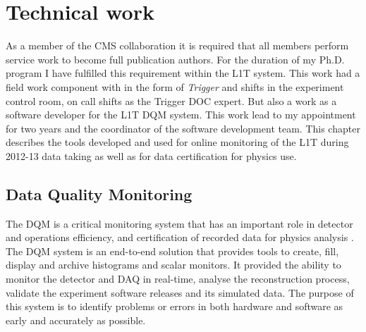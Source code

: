 \chapter{Technical work}
\label{CHAPTER:TechnicalWork}

\glsresetall %


As a member of the \gls{CMS} collaboration it is required that all members perform service work to become full publication authors. For the duration of my Ph.D. program I have fulfilled this requirement within the \gls{L1T} system. This work had a field work component with in the form of \textit{Trigger} and  shifts in the experiment control room, on call shifts as the Trigger \gls{DOC} expert. But also a work as a software developer for the \gls{L1T} \gls{DQM} system. This work lead to my appointment for two years and the coordinator of the software development team. This chapter describes the tools developed and used for online monitoring of the \gls{L1T} during 2012-13 data taking as well as for data certification for physics use.

\section{Data Quality Monitoring}


The \acrfull{DQM} is a critical monitoring system that has an important role in detector and operations efficiency, and certification of recorded data for physics analysis \cite{CMSTDR:CMSTridasTDRVol1,ARTICLE:CMSDataQualityMonitoringSoftWare_ExperienceAndFuture}. The \gls{DQM} system is an end-to-end solution that provides tools to create, fill, display and archive histograms and scalar monitors. It provided the ability to monitor the detector and \gls{DAQ} in real-time, analyse the reconstruction process, validate the experiment software releases and its simulated data. The purpose of this system is to identify problems or errors in both hardware and software as early and accurately as possible.

